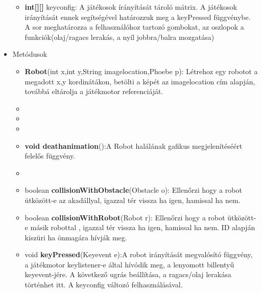 \begin{itemize}
\begin{itemize}
		\item \textbf{int[][]} keyconfig: A játékosok írányítását tároló mátrix. A játékosok irányítását ennek segítségével határozzuk meg a keyPressed függvénybe. A sor meghatározza a felhasználóhoz tartozó gombokat, az oszlopok a funkciók(olaj/ragacs lerakás, a nyíl jobbra/balra mozgatása)
\end{itemize}
\item Metódusok\\
	\begin{itemize}
		\item \textbf{Robot}(int x,int y,String imagelocation,Phoebe p): Létrehoz egy robotot a megadott x,y kordinátákon, betölti a képét az imagelocation cím alapján, továbbá eltárolja a játékmotor referenciáját.
		\item{}
		\item{}
		\item{}
		\item \textbf{void deathanimation}():A Robot halálának gafikus megjelenítéséért felelős függvény.
		\item{}
		\item boolean \textbf{collisionWithObstacle}(Obstacle o): Ellenőrzi hogy a robot ütközött-e az akadállyal, igazzal tér vissza ha igen, hamissal ha nem.
		\item boolean \textbf{collisionWithRobot}(Robot r): Ellenőrzi hogy a robot ütközött-e másik robottal , igazzal tér vissza ha igen, hamissal ha nem. ID alapján kiszüri ha önmagára hívják meg.
		\item void \textbf{keyPressed}(Keyevent e):A robot irányítását megvalósító függvény, a játékmotor keylistener-e által hívódik meg, a lenyomott billentyű keyevent-jére. A következő ugrás beállítása, a ragacs/olaj lerakása történhet itt. A keyconfig változó felhasználásával.
	\end{itemize}
\end{itemize}

